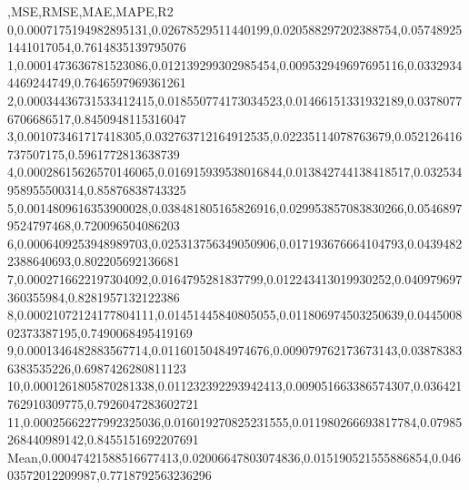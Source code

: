 ,MSE,RMSE,MAE,MAPE,R2
0,0.0007175194982895131,0.02678529511440199,0.020588297202388754,0.057489251441017054,0.7614835139795076
1,0.0001473636781523086,0.012139299302985454,0.009532949697695116,0.03329344469244749,0.7646597969361261
2,0.00034436731533412415,0.018550774173034523,0.01466151331932189,0.03780776706686517,0.8450948115316047
3,0.001073461717418305,0.032763712164912535,0.02235114078763679,0.052126416737507175,0.5961772813638739
4,0.00028615626570146065,0.016915939538016844,0.013842744138418517,0.032534958955500314,0.85876838743325
5,0.0014809616353900028,0.038481805165826916,0.029953857083830266,0.05468979524797468,0.720096504086203
6,0.0006409253948989703,0.025313756349050906,0.017193676664104793,0.04394822388640693,0.802205692136681
7,0.0002716622197304092,0.0164795281837799,0.012243413019930252,0.040979697360355984,0.8281957132122386
8,0.00021072124177804111,0.01451445840805055,0.011806974503250639,0.044500802373387195,0.7490068495419169
9,0.0001346482883567714,0.01160150484974676,0.009079762173673143,0.038783836383535226,0.6987426280811123
10,0.0001261805870281338,0.011232392293942413,0.009051663386574307,0.036421762910309775,0.7926047283602721
11,0.00025662277992325036,0.016019270825231555,0.011980266693817784,0.07985268440989142,0.8455151692207691
Mean,0.00047421588516677413,0.02006647803074836,0.015190521555886854,0.04603572012209987,0.7718792563236296
